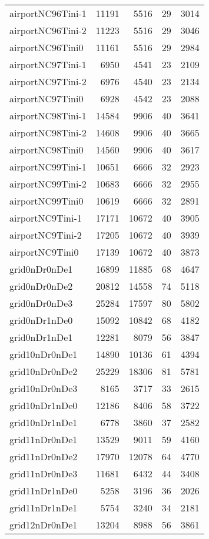 \begin{longtable}{lrrrr}
airportNC96Tini-1 & 11191 & 5516 & 29 & 3014 \\
airportNC96Tini-2 & 11223 & 5516 & 29 & 3046 \\
airportNC96Tini0 & 11161 & 5516 & 29 & 2984 \\
airportNC97Tini-1 & 6950 & 4541 & 23 & 2109 \\
airportNC97Tini-2 & 6976 & 4540 & 23 & 2134 \\
airportNC97Tini0 & 6928 & 4542 & 23 & 2088 \\
airportNC98Tini-1 & 14584 & 9906 & 40 & 3641 \\
airportNC98Tini-2 & 14608 & 9906 & 40 & 3665 \\
airportNC98Tini0 & 14560 & 9906 & 40 & 3617 \\
airportNC99Tini-1 & 10651 & 6666 & 32 & 2923 \\
airportNC99Tini-2 & 10683 & 6666 & 32 & 2955 \\
airportNC99Tini0 & 10619 & 6666 & 32 & 2891 \\
airportNC9Tini-1 & 17171 & 10672 & 40 & 3905 \\
airportNC9Tini-2 & 17205 & 10672 & 40 & 3939 \\
airportNC9Tini0 & 17139 & 10672 & 40 & 3873 \\
grid0nDr0nDe1 & 16899 & 11885 & 68 & 4647 \\
grid0nDr0nDe2 & 20812 & 14558 & 74 & 5118 \\
grid0nDr0nDe3 & 25284 & 17597 & 80 & 5802 \\
grid0nDr1nDe0 & 15092 & 10842 & 68 & 4182 \\
grid0nDr1nDe1 & 12281 & 8079 & 56 & 3847 \\
grid10nDr0nDe1 & 14890 & 10136 & 61 & 4394 \\
grid10nDr0nDe2 & 25229 & 18306 & 81 & 5781 \\
grid10nDr0nDe3 & 8165 & 3717 & 33 & 2615 \\
grid10nDr1nDe0 & 12186 & 8406 & 58 & 3722 \\
grid10nDr1nDe1 & 6778 & 3860 & 37 & 2582 \\
grid11nDr0nDe1 & 13529 & 9011 & 59 & 4160 \\
grid11nDr0nDe2 & 17970 & 12078 & 64 & 4770 \\
grid11nDr0nDe3 & 11681 & 6432 & 44 & 3408 \\
grid11nDr1nDe0 & 5258 & 3196 & 36 & 2026 \\
grid11nDr1nDe1 & 5754 & 3240 & 34 & 2181 \\
grid12nDr0nDe1 & 13204 & 8988 & 56 & 3861 \\

\end{longtable}
